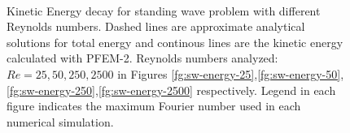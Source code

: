   \begin{figure}[h]
  \centering
     \\
   \caption{Kinetic Energy decay for standing wave problem with different Reynolds numbers. Dashed lines are approximate analytical solutions for total energy and continous lines are the kinetic energy calculated with PFEM-2. Reynolds numbers analyzed: $Re=25,50,250,2500$ in Figures \ref{fg:sw-energy-25},\ref{fg:sw-energy-50},\ref{fg:sw-energy-250},\ref{fg:sw-energy-2500} respectively. Legend in each figure indicates the maximum Fourier number used in each numerical simulation.}
   \label{fg:sw-energy}
\end{figure}

